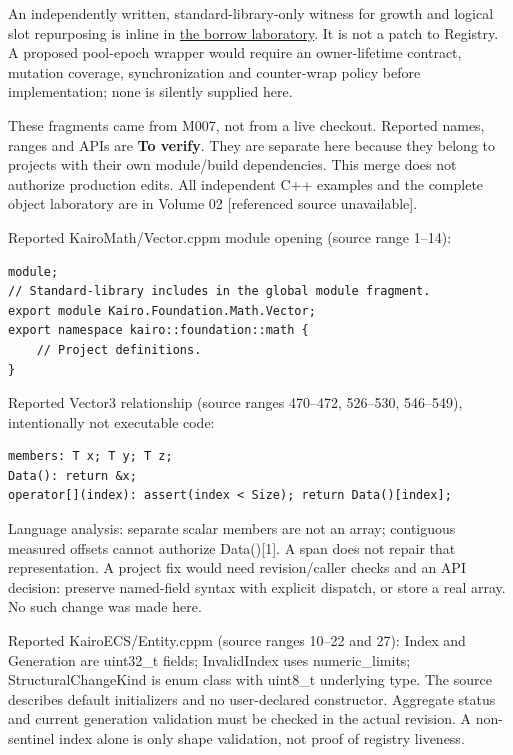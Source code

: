 An independently written, standard-library-only witness for growth and logical slot repurposing is inline in \hyperref[01-foundations-i-ch004-complete-runnable-borrow-laboratory]{the borrow laboratory}. It is not a patch to Registry. A proposed pool-epoch wrapper would require an owner-lifetime contract, mutation coverage, synchronization and counter-wrap policy before implementation; none is silently supplied here.

These fragments came from M007, not from a live checkout. Reported names, ranges and APIs are \textbf{To verify}. They are separate here because they belong to projects with their own module/build dependencies. This merge does not authorize production edits. All independent C++ examples and the complete object laboratory are in {Volume 02 {[}referenced source unavailable{]}}.

Reported KairoMath/Vector.cppm module opening (source range 1--14):

\begin{verbatim}
module;
// Standard-library includes in the global module fragment.
export module Kairo.Foundation.Math.Vector;
export namespace kairo::foundation::math {
    // Project definitions.
}
\end{verbatim}

Reported Vector3 relationship (source ranges 470--472, 526--530, 546--549), intentionally not executable code:

\begin{verbatim}
members: T x; T y; T z;
Data(): return &x;
operator[](index): assert(index < Size); return Data()[index];
\end{verbatim}

Language analysis: separate scalar members are not an array; contiguous measured offsets cannot authorize Data(){[}1{]}. A span does not repair that representation. A project fix would need revision/caller checks and an API decision: preserve named-field syntax with explicit dispatch, or store a real array. No such change was made here.

Reported KairoECS/Entity.cppm (source ranges 10--22 and 27): Index and Generation are uint32\_t fields; InvalidIndex uses numeric\_limits; StructuralChangeKind is enum class with uint8\_t underlying type. The source describes default initializers and no user-declared constructor. Aggregate status and current generation validation must be checked in the actual revision. A non-sentinel index alone is only shape validation, not proof of registry liveness.

